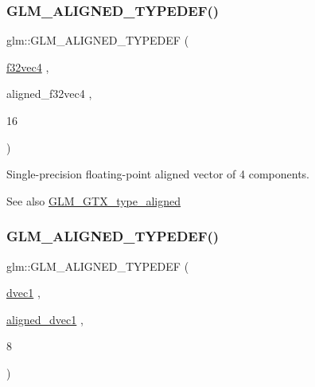\subsubsection{\texorpdfstring{G\+L\+M\+\_\+\+A\+L\+I\+G\+N\+E\+D\+\_\+\+T\+Y\+P\+E\+D\+E\+F()}{GLM\_ALIGNED\_TYPEDEF()}\hspace{0.1cm}{\footnotesize\ttfamily [154/209]}}
{\footnotesize\ttfamily glm\+::\+G\+L\+M\+\_\+\+A\+L\+I\+G\+N\+E\+D\+\_\+\+T\+Y\+P\+E\+D\+EF (\begin{DoxyParamCaption}\item[{\hyperlink{group__gtc__type__precision_ga6848e3b5cb5c1f4c117717b309e726eb}{f32vec4}}]{,  }\item[{aligned\+\_\+f32vec4}]{,  }\item[{16}]{ }\end{DoxyParamCaption})}

Single-\/precision floating-\/point aligned vector of 4 components. \begin{DoxySeeAlso}{See also}
\hyperlink{group__gtx__type__aligned}{G\+L\+M\+\_\+\+G\+T\+X\+\_\+type\+\_\+aligned} 
\end{DoxySeeAlso}
\mbox{\label{group__gtx__type__aligned_ga3e0f35fa0c626285a8bad41707e7316c}} 
\subsubsection{\texorpdfstring{G\+L\+M\+\_\+\+A\+L\+I\+G\+N\+E\+D\+\_\+\+T\+Y\+P\+E\+D\+E\+F()}{GLM\_ALIGNED\_TYPEDEF()}\hspace{0.1cm}{\footnotesize\ttfamily [155/209]}}
{\footnotesize\ttfamily glm\+::\+G\+L\+M\+\_\+\+A\+L\+I\+G\+N\+E\+D\+\_\+\+T\+Y\+P\+E\+D\+EF (\begin{DoxyParamCaption}\item[{\hyperlink{vec1_8hpp_a8d5252eec287cf34cc18a219a118f9f2}{dvec1}}]{,  }\item[{\hyperlink{group__gtc__type__aligned_ga81fe4410dc880770293c53fcba83c9e4}{aligned\+\_\+dvec1}}]{,  }\item[{8}]{ }\end{DoxyParamCaption})}

